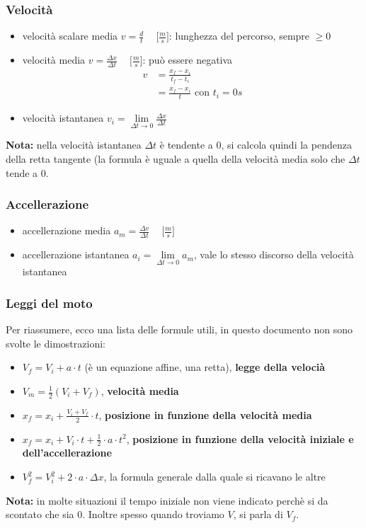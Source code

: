 \documentclass[../main.tex]{subfiles}
\begin{document}
\subsubsection{Velocità}
\begin{itemize}
    \item velocità scalare media $v=\frac{d}{t} \phantom{-} \lbrack \frac{m}{s}\rbrack$: lunghezza del percorso, sempre $\geq 0$
    \item velocità media $v=\frac{\Delta x}{\Delta t} \phantom{-}\lbrack \frac{m}{s}\rbrack$: può essere negativa \begin{align*}
        v&=\frac{x_f-x_i}{t_f-t_i} \\
        &=\frac{x_f-x_i}{t} \text{ con } t_i=0s
    \end{align*}
    \item velocità istantanea $v_i=\lim\limits_{\Delta t \to 0}\frac{\Delta x}{\Delta t}$
\end{itemize}
\textbf{Nota:} nella velocità istantanea $\Delta t$ è tendente a 0, si calcola quindi la pendenza della retta tangente (la formula è uguale a quella della velocità media solo che $\Delta t$ tende a $0$.

\subsubsection{Accellerazione}
\begin{itemize}
    \item accellerazione media $a_m=\frac{\Delta v}{\Delta t} \phantom{-} \lbrack \frac{m}{s}\rbrack$
    \item accellerazione istantanea $a_i=\lim\limits_{\Delta t \to 0}a_m$, vale lo stesso discorso della velocità istantanea
\end{itemize}

\subsubsection{Leggi del moto}
Per riassumere, ecco una lista delle formule utili, in questo documento non sono svolte le dimostrazioni:
\begin{itemize}
    \item $V_f = V_i + a \cdot t$ (è un equazione affine, una retta), \textbf{legge della velocià}
    \item $V_m = \frac{1}{2}(V_i+V_f)$, \textbf{velocità media}
    \item $x_f = x_i + \frac{V_i + V_f}{2} \cdot t$, \textbf{posizione in funzione della velocità media}
    \item $x_f = x_i + V_i \cdot t + \frac{1}{2} \cdot a \cdot t^2$, \textbf{posizione in funzione della velocità iniziale e dell'accellerazione}
    \item $V_f^2 = V_i^2 + 2 \cdot a \cdot \Delta x$, la formula generale dalla quale si ricavano le altre
\end{itemize}
\textbf{Nota:} in molte situazioni il tempo iniziale non viene indicato perchè si da scontato che sia $0$.
Inoltre spesso quando troviamo $V$, si parla di $V_f$.
\end{document}

